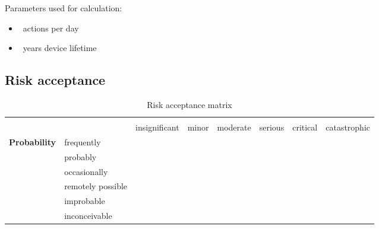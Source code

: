 \documentclass{../../git_submodules/common_docu/doc_class}
\begin{document}
Parameters used for calculation:
\begin{itemize}
  \item \NumActionsPerDay~actions per day
  \item \NumYearsLifeTime~years device lifetime
\end{itemize}

\subsection{Risk acceptance}

\begin{table}[H]
  \begin{tabular}{l>{\small}l|c|c|c|c|c|c|}
	\hhline{~~------}
    \multicolumn{2}{l|}{\multirow{2}{*}{}} & \multicolumn{6}{c|}{\textbf{Severity}} \\ %
    \multicolumn{2}{l|}{} & \small{insignificant} & \small{ minor} & \small{moderate} & \small{serious} & \small{critical} & \small{catastrophic} \\ \hline
    \multicolumn{1}{|c}{\multirow{6}{*}{\textbf{Probability}}} & frequently & 
    \cellcolor{colorRiskRed} & \cellcolor{colorRiskRed} & \cellcolor{colorRiskRed} & \cellcolor{colorRiskRed} & \cellcolor{colorRiskRed} & \cellcolor{colorRiskRed} \\ \hhline{|~-------}
    \multicolumn{1}{|l}{} & probably & 
    \cellcolor{colorRiskYellow} & \cellcolor{colorRiskRed} & \cellcolor{colorRiskRed} & \cellcolor{colorRiskRed} & \cellcolor{colorRiskRed} & \cellcolor{colorRiskRed} \\ \hhline{|~-------}
    \multicolumn{1}{|l}{} & occasionally & 
    \cellcolor{colorRiskYellow} & \cellcolor{colorRiskYellow} & \cellcolor{colorRiskRed} & \cellcolor{colorRiskRed} & \cellcolor{colorRiskRed} & \cellcolor{colorRiskRed} \\ \hhline{|~-------}
    \multicolumn{1}{|l}{} & remotely possible & 
    \cellcolor{colorRiskYellow} & \cellcolor{colorRiskYellow} & \cellcolor{colorRiskYellow} & \cellcolor{colorRiskRed} & \cellcolor{colorRiskRed} & \cellcolor{colorRiskRed} \\ \hhline{|~-------}
    \multicolumn{1}{|l}{} & improbable & 
    \cellcolor{colorRiskYellow} & \cellcolor{colorRiskYellow} & \cellcolor{colorRiskYellow} & \cellcolor{colorRiskYellow} & \cellcolor{colorRiskRed} & \cellcolor{colorRiskRed} \\ \hhline{|~-------}
    \multicolumn{1}{|l}{} & inconceivable & 
    \cellcolor{colorRiskYellow} & \cellcolor{colorRiskYellow} & \cellcolor{colorRiskYellow} & \cellcolor{colorRiskYellow} & \cellcolor{colorRiskYellow} & \cellcolor{colorRiskRed} \\ \hline
  \end{tabular}
  \caption{Risk acceptance matrix}
\end{table}
\end{document}

